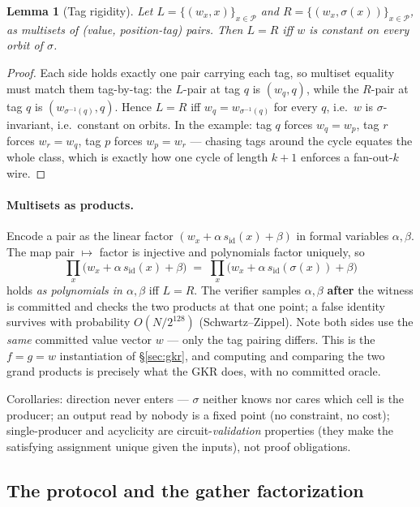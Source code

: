 \documentclass[11pt]{article}
\newcommand{\sid}{s_{\mathrm{id}}}
\newcommand{\cells}{\mathcal{P}}
\newtheorem{lemma}{Lemma}
\theoremstyle{definition}
\begin{document}
\begin{lemma}[Tag rigidity]\label{lem:tags}
Let $L = \{(w_x, x)\}_{x\in\cells}$ and
$R = \{(w_x, \sigma(x))\}_{x\in\cells}$, as multisets of
(value, position-tag) pairs. Then $L = R$ iff $w$ is constant on every
orbit of $\sigma$.
\end{lemma}

\begin{proof}
Each side holds exactly one pair carrying each tag, so multiset equality
must match them tag-by-tag: the $L$-pair at tag $q$ is $(w_q, q)$, while
the $R$-pair at tag $q$ is $(w_{\sigma^{-1}(q)}, q)$. Hence $L = R$ iff
$w_q = w_{\sigma^{-1}(q)}$ for every $q$, i.e.\ $w$ is
$\sigma$-invariant, i.e.\ constant on orbits. In the example: tag $q$
forces $w_q = w_p$, tag $r$ forces $w_r = w_q$, tag $p$ forces
$w_p = w_r$ --- chasing tags around the cycle equates the whole class,
which is exactly how one cycle of length $k{+}1$ enforces a fan-out-$k$
wire.
\end{proof}

\paragraph{Multisets as products.} Encode a pair as the linear factor
$(w_x + \alpha\,\sid(x) + \beta)$ in formal variables $\alpha, \beta$.
The map pair $\mapsto$ factor is injective and polynomials factor
uniquely, so
\[
  \prod_x \bigl(w_x + \alpha\,\sid(x) + \beta\bigr)
  \;=\;
  \prod_x \bigl(w_x + \alpha\,\sid(\sigma(x)) + \beta\bigr)
\]
holds \emph{as polynomials in $\alpha,\beta$} iff $L = R$. The verifier
samples $\alpha, \beta$ \textbf{after} the witness is committed and
checks the two products at that one point; a false identity survives with
probability $O(N/2^{128})$ (Schwartz--Zippel). Note both sides use the
\emph{same} committed value vector $w$ --- only the tag pairing differs.
This is the $f{=}g{=}w$ instantiation of \S\ref{sec:gkr}, and computing
and comparing the two grand products is precisely what the GKR does,
with no committed oracle.

Corollaries: direction never enters --- $\sigma$ neither knows nor cares
which cell is the producer; an output read by nobody is a fixed point
(no constraint, no cost); single-producer and acyclicity are
circuit-\emph{validation} properties (they make the satisfying
assignment unique given the inputs), not proof obligations.

\subsection{The protocol and the gather factorization}
\end{document}
